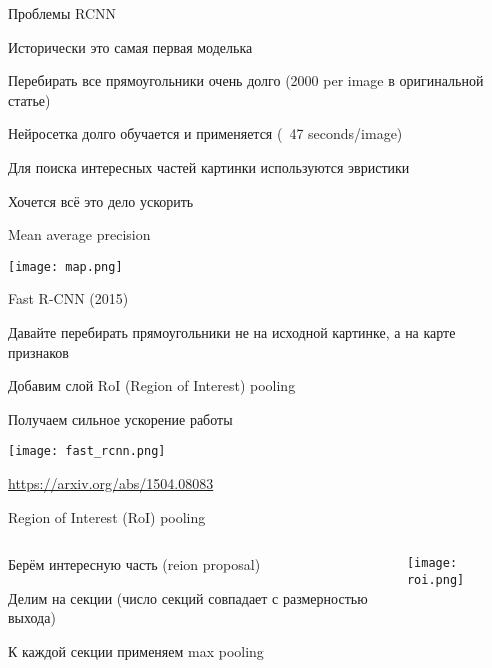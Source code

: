 \documentclass[notes,12pt, aspectratio=169]{beamer}
\newenvironment{wideitemize}{\itemize\addtolength{\itemsep}{10pt}}{\enditemize}
\begin{document}
 \begin{frame}{Проблемы RCNN}
 	\begin{wideitemize}
 		\item Исторически это самая первая моделька
 		\item Перебирать все прямоугольники очень долго (2000 per image в оригинальной статье)
 		\item Нейросетка долго обучается и применяется  (~47 seconds/image)
 		\item Для поиска интересных частей картинки используются эвристики 
 		\item \alert{Хочется всё это дело ускорить}
 	\end{wideitemize}
 \end{frame}


\begin{frame}{Mean average precision}
\begin{center}
	\texttt{[image: map.png]}
\end{center}
\end{frame}


\begin{frame}{Fast R-CNN (2015)}
\begin{wideitemize}
	\item Давайте перебирать прямоугольники не на исходной картинке, а на карте признаков
	\item Добавим слой RoI (Region of Interest) pooling
	\item Получаем сильное ускорение работы
\end{wideitemize}	
	\begin{center}
		\texttt{[image: fast\_rcnn.png]}
	\end{center}
	
	\vfill
	\footnotesize
	{\color{blue} \url{https://arxiv.org/abs/1504.08083}} 
\end{frame}


\begin{frame}{Region of Interest (RoI) pooling}
	\begin{columns}[T] %
		\begin{column}{.49\textwidth}
			\begin{wideitemize}	
				\item Берём интересную часть (reion proposal)
				\item Делим на секции (число секций совпадает с размерностью выхода)
				\item К каждой секции применяем max pooling
			\end{wideitemize}
		\end{column}%
		\hfill%
		\begin{column}{.49\textwidth}
			\begin{center}
				\texttt{[image: roi.png]}
			\end{center}
		\end{column}%
	\end{columns}
\end{frame}
\end{document}
